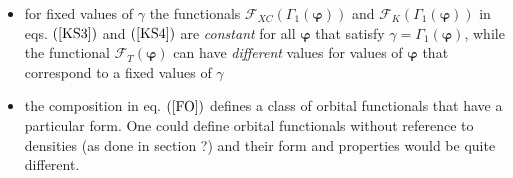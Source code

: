 \documentclass[aps,preprint]{revtex4}%
\begin{document}
\begin{itemize}
\item for fixed values of $\gamma$ the functionals $\mathcal{F}_{XC}\left(
\Gamma_{1}\left(  \mathbf{\varphi}\right)  \right)  $ and $\mathcal{F}%
_{K}\left(  \Gamma_{1}\left(  \mathbf{\varphi}\right)  \right)  $ in eqs.
$\left(  \ref{KS3}\right)  $ and $\left(  \ref{KS4}\right)  $ are
\emph{constant} for all $\mathbf{\varphi}$ that satisfy $\gamma=\Gamma
_{1}\left(  \mathbf{\varphi}\right)  $, while the functional $\mathcal{F}%
_{T}\left(  \mathbf{\varphi}\right)  $ can have \emph{different} values for
values of $\mathbf{\varphi}$ that correspond to a fixed values of $\gamma$

\item the composition in eq. $\left(  \ref{FO}\right)  $ defines a class of
orbital functionals that have a particular form. One could define orbital
functionals without reference to densities (as done in section ?) and their
form and properties would be quite different.
\end{itemize}
\end{document}
